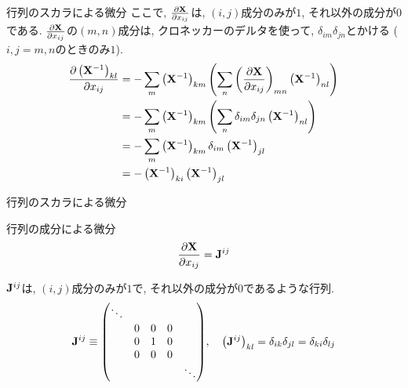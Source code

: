 \documentclass[dvipdfmx,notheorems,t]{beamer}
\begin{document}
\begin{frame}{行列のスカラによる微分}
ここで, $\pdv{\vb{X}}{x_{ij}}$は, $(i, j)$成分のみが$1$, それ以外の成分が$0$である.
$\pdv{\vb{X}}{x_{ij}}$の$(m, n)$成分は, クロネッカーのデルタを使って, $\delta_{im} \delta_{jn}$とかける
($i, j = m, n$のときのみ$1$).
\begin{align*}
  \pdv{\left( \vb{X}^{-1} \right)_{kl}}{x_{ij}}
    &= -\sum_m \left( \vb{X}^{-1} \right)_{km}
      \left( \sum_n \left( \pdv{\vb{X}}{x_{ij}} \right)_{mn} \left( \vb{X}^{-1} \right)_{nl} \right) \\
    &= -\sum_m \left( \vb{X}^{-1} \right)_{km}
      \left( \sum_n \delta_{im} \delta_{jn} \left( \vb{X}^{-1} \right)_{nl} \right) \\
    &= -\sum_m \left( \vb{X}^{-1} \right)_{km} \delta_{im} \left( \vb{X}^{-1} \right)_{jl} \\
    &= -\left( \vb{X}^{-1} \right)_{ki} \left( \vb{X}^{-1} \right)_{jl}
\end{align*}
\end{frame}

\begin{frame}{行列のスカラによる微分}
\begin{block}{行列の成分による微分}
  \begin{align*}
    \pdv{\vb{X}}{x_{ij}} = \vb{J}^{ij}
  \end{align*}
\end{block}

$\vb{J}^{ij}$は, $(i, j)$成分のみが$1$で, それ以外の成分が$0$であるような行列.
\begin{align*}
  \vb{J}^{ij} \equiv \mqty(
    \ddots & & & & \\
    & 0 & 0 & 0 & \\
    & 0 & 1 & 0 & \\
    & 0 & 0 & 0 & \\
    & & & & \ddots), \quad
    \left( \vb{J}^{ij} \right)_{kl} = \delta_{ik} \delta_{jl} = \delta_{ki} \delta_{lj}
\end{align*}
\end{frame}
\end{document}
